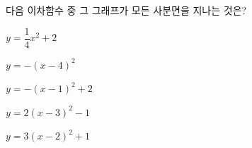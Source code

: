 다음 이차함수 중 그 그래프가 모든 사분면을 지나는 것은?
\begin{choicesv}{\rule[-3ex]{0pt}{8ex}$y=\dfrac{1}{4}x^2+2$}{\rule[-3ex]{0pt}{8ex}$y=-(x-4)^2$}{\rule[-3ex]{0pt}{8ex}$y=-(x-1)^2+2$}{\rule[-3ex]{0pt}{8ex}$y=2(x-3)^2-1$}{\rule[-3ex]{0pt}{8ex}$y=3(x-2)^2+1$}\end{choicesv}

